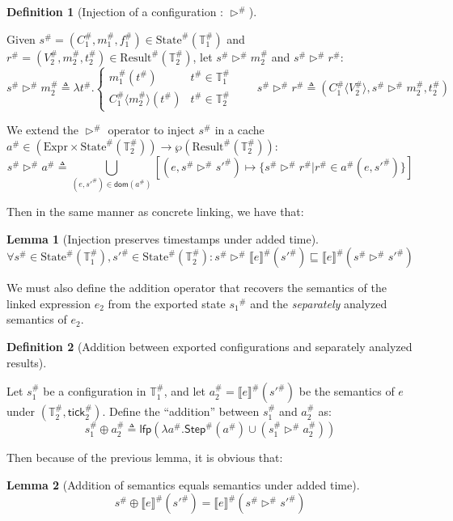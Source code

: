 \documentclass[acmsmall,review]{acmart}\settopmatter{printfolios=true,printccs=false,printacmref=false}
\theoremstyle{definition}
\newtheorem{definition}{Definition}[section]
\newtheorem{lem}{Lemma}[section]
\newcommand*{\A}[1]{{#1}^{\#}}
\newcommand*{\Expr}{\text{Expr}}
\newcommand*{\Time}{\mathbb{T}}
\newcommand*{\ATime}{\A{\Time}}
\newcommand*{\mem}{m}
\newcommand*{\AState}[1]{\A{\text{State}}({#1})}
\newcommand*{\AResult}[1]{\A{\text{Result}}({#1})}
\newcommand*{\sembracket}[1]{\lBrack{#1}\rBrack}
\newcommand*{\tick}{\mathsf{tick}}
\newcommand*{\inject}[2]{{#1}\langle{#2}\rangle}
\begin{document}
\begin{definition}[Injection of a configuration : $\A\rhd$]
  $\:$

  Given $\A{s}=(\A{C}_1,\A{\mem}_1,\A{f}_1)\in\AState{\ATime_1}$ and $\A{r}=(\A{V}_2,\A{\mem}_2,\A{t}_2)\in\AResult{\ATime_2}$,
  let $\A{s}\A\rhd \A{\mem}_2$ and $\A{s}\A\rhd \A{r}$:
  \[
    \A{s}\A\rhd\A{\mem}_2\triangleq
    \lambda \A{t}.
    \begin{cases}
      \A{\mem}_1(\A{t})                   & \A{t}\in\ATime_1 \\
      \inject{\A{C}_1}{\A{\mem}_2}(\A{t}) & \A{t}\in\ATime_2
    \end{cases}
    \qquad
    \A{s}\A\rhd \A{r}\triangleq
    (\inject{\A{C}_1}{\A{V}_2},\A{s}\A\rhd \A{\mem}_2,\A{t}_2)
  \]

  We extend the $\A\rhd$ operator to inject $\A{s}$ in a cache $\A{a}\in(\Expr\times\AState{\ATime_2})\rightarrow{\wp(\AResult{\ATime_2})}$:
  \[
    \A{s}\A\rhd\A{a}\triangleq\bigcup_{(e,\A{s'})\in\mathsf{dom}(\A{a})}[(e,\A{s}\A\rhd\A{s'})\mapsto\{\A{s}\A\rhd\A{r}|\A{r}\in\A{a}(e,\A{s'})\}]
  \]
\end{definition}

Then in the same manner as concrete linking, we have that:

\begin{lem}[Injection preserves timestamps under added time]
  \[
    \forall \A{s}\in\AState{\ATime_1},\A{s'}\in\AState{\ATime_2}:\A{s}\A\rhd{\A{\sembracket{e}}}(\A{s'})\sqsubseteq\A{\sembracket{e}}(\A{s}\A\rhd\A{s'})
  \]
\end{lem}

We must also define the addition operator that recovers the semantics of the linked expression $e_2$ from the exported state $\A{s_1}$ and the \emph{separately} analyzed semantics of $e_2$.

\begin{definition}[Addition between exported configurations and separately analyzed results]
  $\:$

  Let $\A{s}_1$ be a configuration in $\ATime_1$, and let $\A{a}_2=\A{\sembracket{e}}(\A{s'})$ be the semantics of $e$ under $(\ATime_2,\A\tick_2)$.
  Define the ``addition'' between $\A{s}_1$ and $\A{a}_2$ as:
  \[
    \A{s}_1\oplus\A{a}_2\triangleq\mathsf{lfp}(\lambda\A{a}.\A{\mathsf{Step}}(\A{a})\cup(\A{s}_1\A\rhd\A{a}_2))
  \]
\end{definition}

Then because of the previous lemma, it is obvious that:
\begin{lem}[Addition of semantics equals semantics under added time]
  \[
    \A{s}\oplus\A{\sembracket{e}}(\A{s'}) = \A{\sembracket{e}}(\A{s}\A\rhd\A{s'})
  \]
\end{lem}
\end{document}

